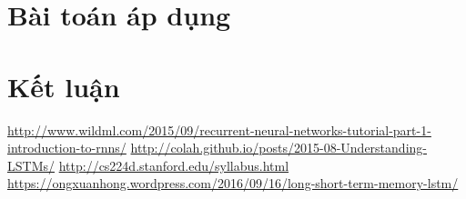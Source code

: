 \documentclass[a4paper,12pt]{report}
\begin{document}
\chapter{Bài toán áp dụng}


\chapter{Kết luận} 
\begin{thebibliography}{9}
 \url{http://www.wildml.com/2015/09/recurrent-neural-networks-tutorial-part-1-introduction-to-rnns/}
 \url{http://colah.github.io/posts/2015-08-Understanding-LSTMs/}
 \url{http://cs224d.stanford.edu/syllabus.html}
 \url{https://ongxuanhong.wordpress.com/2016/09/16/long-short-term-memory-lstm/}
\end{thebibliography}
\end{document}
